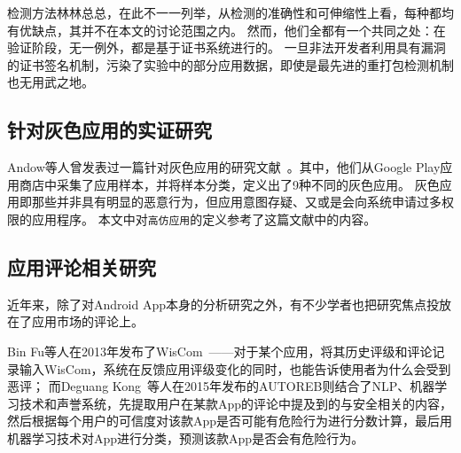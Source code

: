 检测方法林林总总，在此不一一列举，从检测的准确性和可伸缩性上看，每种都均有优缺点，其并不在本文的讨论范围之内。
然而，他们全都有一个共同之处：在验证阶段，无一例外，都是基于证书系统进行的。
一旦非法开发者利用具有漏洞的证书签名机制，污染了实验中的部分应用数据，即使是最先进的重打包检测机制也无用武之地。

\subsection{针对灰色应用的实证研究}

Andow等人曾发表过一篇针对灰色应用的研究文献~\cite{Andow2016ASO}。其中，他们从Google Play应用商店中采集了应用样本，并将样本分类，定义出了9种不同的灰色应用。
灰色应用即那些并非具有明显的恶意行为，但应用意图存疑、又或是会向系统申请过多权限的应用程序。
本文中对\texttt{高仿应用}的定义参考了这篇文献中的内容。

\subsection{应用评论相关研究}
近年来，除了对Android App本身的分析研究之外，有不少学者也把研究焦点投放在了应用市场的评论上。

Bin Fu等人在2013年发布了WisCom~\cite{fu2013people}——对于某个应用，将其历史评级和评论记录输入WisCom，系统在反馈应用评级变化的同时，也能告诉使用者为什么会受到恶评；
而Deguang Kong~\cite{kong2015autoreb}等人在2015年发布的AUTOREB则结合了NLP、机器学习技术和声誉系统，先提取用户在某款App的评论中提及到的与安全相关的内容，然后根据每个用户的可信度对该款App是否可能有危险行为进行分数计算，最后用机器学习技术对App进行分类，预测该款App是否会有危险行为。

